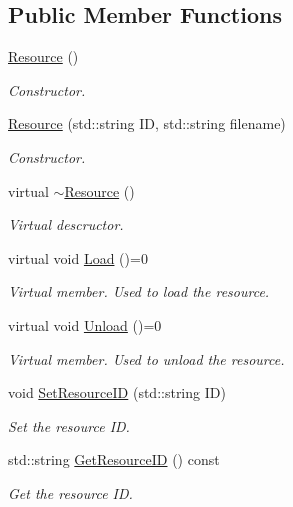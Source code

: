 \subsection*{Public Member Functions}
\begin{DoxyCompactItemize}
\item 
\mbox{\hyperlink{classsfmlbe_1_1_resource_afc4c45a3b69da3904ab98d8096a5dbf6}{Resource}} ()
\begin{DoxyCompactList}\small\item\em Constructor. \end{DoxyCompactList}\item 
\mbox{\hyperlink{classsfmlbe_1_1_resource_a93030eb6f15353680a352fe10b204842}{Resource}} (std\+::string ID, std\+::string filename)
\begin{DoxyCompactList}\small\item\em Constructor. \end{DoxyCompactList}\item 
virtual \mbox{\hyperlink{classsfmlbe_1_1_resource_a54ad6b8a18e74283c707ec1622c94f9f}{$\sim$\+Resource}} ()
\begin{DoxyCompactList}\small\item\em Virtual descructor. \end{DoxyCompactList}\item 
virtual void \mbox{\hyperlink{classsfmlbe_1_1_resource_a35981869a1e90ebbf30258ff7aa1d6d2}{Load}} ()=0
\begin{DoxyCompactList}\small\item\em Virtual member. Used to load the resource. \end{DoxyCompactList}\item 
virtual void \mbox{\hyperlink{classsfmlbe_1_1_resource_a48c75a88679cf457965dd013f47014b9}{Unload}} ()=0
\begin{DoxyCompactList}\small\item\em Virtual member. Used to unload the resource. \end{DoxyCompactList}\item 
void \mbox{\hyperlink{classsfmlbe_1_1_resource_a5f3c845ac15aa355434fe79baca5a019}{Set\+Resource\+ID}} (std\+::string ID)
\begin{DoxyCompactList}\small\item\em Set the resource ID. \end{DoxyCompactList}\item 
std\+::string \mbox{\hyperlink{classsfmlbe_1_1_resource_ae1fb20f1b0e913db9714be96612556c0}{Get\+Resource\+ID}} () const
\begin{DoxyCompactList}\small\item\em Get the resource ID. \end{DoxyCompactList}\item 

\end{DoxyCompactItemize}
